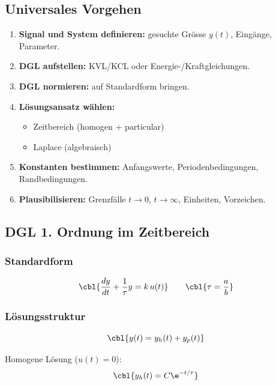
\subsection{Universales Vorgehen}

\begin{enumerate}
    \item \textbf{Signal und System definieren:} gesuchte Grösse $y(t)$, Eingänge, Parameter.
    \item \textbf{DGL aufstellen:} KVL/KCL oder Energie-/Kraftgleichungen.
    \item \textbf{DGL normieren:} auf Standardform bringen.
    \item \textbf{Lösungsansatz wählen:}
    \begin{itemize}
        \item Zeitbereich (homogen + particular)
        \item Laplace (algebraisch)
    \end{itemize}
    \item \textbf{Konstanten bestimmen:} Anfangswerte, Periodenbedingungen, Randbedingungen.
    \item \textbf{Plausibilisieren:} Grenzfälle $t\to 0$, $t\to\infty$, Einheiten, Vorzeichen.
\end{enumerate}

\subsection{DGL 1. Ordnung im Zeitbereich}

\subsubsection{Standardform}

\[
\cbl{\frac{dy}{dt} + \frac{1}{\tau} y = k \, u(t)}
\qquad
\cbl{\tau = \frac{a}{b}}
\]

\subsubsection{Lösungsstruktur}

\[
\cbl{y(t) = y_h(t) + y_p(t)}
\]

Homogene Lösung ($u(t)=0$):
\[
\cbl{y_h(t) = C \e^{-t/\tau}}
\]

